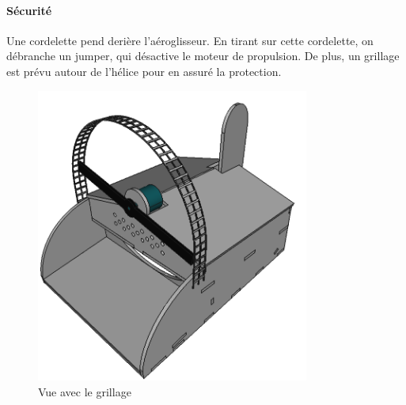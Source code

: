 \documentclass[a4paper,12pt]{book}
\begin{document}
			\paragraph{Sécurité} Une cordelette pend derière l'aéroglisseur. En tirant sur cette cordelette, on débranche un jumper, qui désactive le moteur de propulsion. De plus, un grillage est prévu autour de l'hélice pour en assuré la protection.
			\begin{figure}[h]
					\begin{center}
						\includegraphics[width=0.8\textwidth]{../Illus/AeroProt.png}
					\end{center}
					\caption{Vue avec le grillage}
					
					\label{MEPChticat}
				\end{figure}
\end{document}
